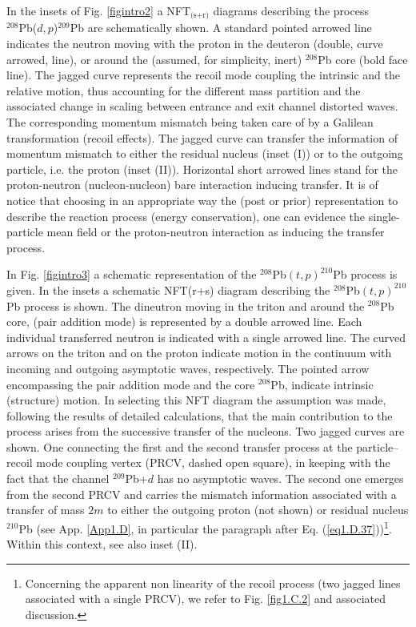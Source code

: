 In the insets of Fig. \ref{figintro2} a NFT$_{\text{(s+r)}}$  diagrams describing the process\\ \mbox{$^{208}$Pb($d,p$)$^{209}$Pb} are schematically shown. A standard pointed arrowed line indicates the neutron moving with the proton in the deuteron (double, curve arrowed, line), or around the (assumed, for simplicity, inert) $^{208}$Pb core (bold face line). The jagged curve represents the recoil  mode coupling the intrinsic and the relative motion,  thus accounting for the different mass partition  and the associated change in scaling between entrance and exit channel distorted waves. The corresponding momentum mismatch being taken care of by a  Galilean transformation (recoil effects). The jagged curve can transfer the information of momentum mismatch to either the residual nucleus (inset (I)) or to the outgoing particle, i.e. the proton (inset (II)).  Horizontal short arrowed lines stand for the proton-neutron (nucleon-nucleon) bare interaction inducing transfer. It is of notice that choosing in an appropriate way the (post or prior) representation to describe the reaction process (energy conservation), one can evidence the single-particle mean field or the proton-neutron interaction as inducing the transfer process.


In Fig. \ref{figintro3} a schematic representation of the $^{208}$Pb$(t,p)^{210}$Pb process is given. In the insets  a schematic NFT(r+s) diagram describing the $^{208}$Pb$(t,p)^{210}$Pb process is shown. The dineutron  moving in the triton and around the $^{208}$Pb core, (pair addition mode) is represented by a double arrowed line. Each individual transferred neutron is indicated with a single arrowed line. The curved arrows on the triton and on the proton indicate motion in the continuum with   incoming and outgoing asymptotic waves, respectively. The pointed arrow encompassing the pair addition mode and the core $^{208}$Pb, indicate intrinsic (structure) motion. In selecting this NFT diagram  the assumption was made, following the results of detailed calculations, that the main contribution to the process arises from the successive transfer of the nucleons. Two jagged curves are shown. One connecting the first and the second transfer process at the particle--recoil mode coupling vertex (PRCV, dashed open square), in keeping with the fact that the channel $^{209}$Pb+$d$ has no asymptotic waves. The second one emerges from the second PRCV and carries the mismatch information associated with a transfer of mass $2m$ to either the outgoing proton (not shown) or residual nucleus $^{210}$Pb (see App. \ref{App1.D}, in particular the  paragraph after Eq. (\ref{eq1.D.37}))\footnote{Concerning the apparent non linearity of the recoil process (two jagged lines associated with a single PRCV), we refer to Fig. \ref{fig1.C.2} and associated discussion.}. Within this context, see also inset (II). 

